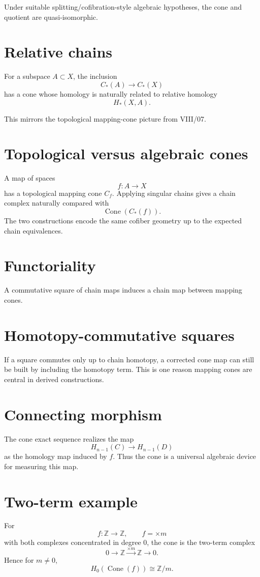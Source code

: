 Under suitable splitting/cofibration-style algebraic hypotheses, the cone and
quotient are quasi-isomorphic.

\section{Relative chains}
For a subspace \(A\subset X\), the inclusion
\[
C_*(A)\to C_*(X)
\]
has a cone whose homology is naturally related to relative homology
\[
H_*(X,A).
\]

This mirrors the topological mapping-cone picture from VIII/07.

\section{Topological versus algebraic cones}
A map of spaces
\[
f:A\to X
\]
has a topological mapping cone \(C_f\).  Applying singular chains gives a chain
complex naturally compared with
\[
\operatorname{Cone}(C_*(f)).
\]
The two constructions encode the same cofiber geometry up to the expected
chain equivalences.

\section{Functoriality}
A commutative square of chain maps induces a chain map between mapping cones.

\section{Homotopy-commutative squares}
If a square commutes only up to chain homotopy, a corrected cone map can still
be built by including the homotopy term.  This is one reason mapping cones are
central in derived constructions.

\section{Connecting morphism}
The cone exact sequence realizes the map
\[
H_{n-1}(C)\to H_{n-1}(D)
\]
as the homology map induced by \(f\).  Thus the cone is a universal algebraic
device for measuring this map.

\section{Two-term example}
For
\[
f:\mathbb Z\to\mathbb Z,\qquad f=\times m
\]
with both complexes concentrated in degree \(0\), the cone is the two-term
complex
\[
0\to\mathbb Z\xrightarrow{\times m}\mathbb Z\to0.
\]
Hence for \(m\ne0\),
\[
H_0(\operatorname{Cone}(f))\cong\mathbb Z/m.
\]

